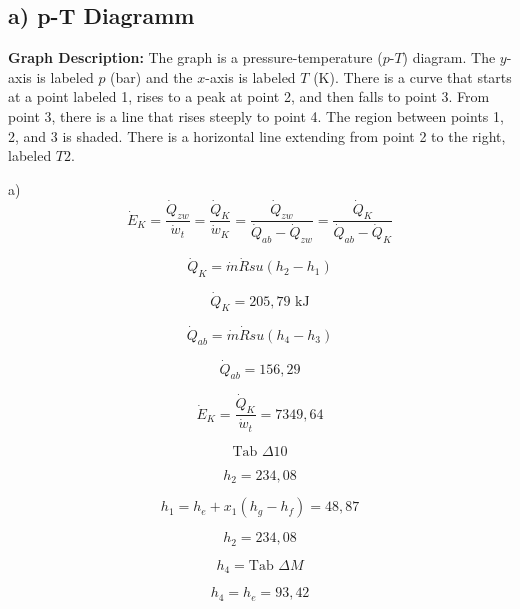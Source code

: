 \subsection*{a) p-T Diagramm}

\textbf{Graph Description:} The graph is a pressure-temperature ($p$-$T$) diagram. The $y$-axis is labeled $p$ (bar) and the $x$-axis is labeled $T$ (K). There is a curve that starts at a point labeled 1, rises to a peak at point 2, and then falls to point 3. From point 3, there is a line that rises steeply to point 4. The region between points 1, 2, and 3 is shaded. There is a horizontal line extending from point 2 to the right, labeled $T2$.

a) 
\[
\dot{E}_K = \frac{\dot{Q}_{zw}}{\dot{w}_t} = \frac{\dot{Q}_K}{\dot{w}_K} = \frac{\dot{Q}_{zw}}{\dot{Q}_{ab} - \dot{Q}_{zw}} = \frac{\dot{Q}_K}{\dot{Q}_{ab} - \dot{Q}_K}
\]

\[
\dot{Q}_K = \dot{m} \dot{R} s u (h_2 - h_1)
\]

\[
\dot{Q}_K = 205,79 \text{ kJ}
\]

\[
\dot{Q}_{ab} = \dot{m} \dot{R} s u (h_4 - h_3)
\]

\[
\dot{Q}_{ab} = 156,29
\]

\[
\dot{E}_K = \frac{\dot{Q}_K}{\dot{w}_t} = 7349,64
\]

\[
\text{Tab } \Delta 10
\]

\[
h_2 = 234,08
\]

\[
h_1 = h_e + x_1 (h_g - h_f) = 48,87
\]

\[
h_2 = 234,08
\]

\[
h_4 = \text{Tab } \Delta M
\]

\[
h_4 = h_e = 93,42
\]